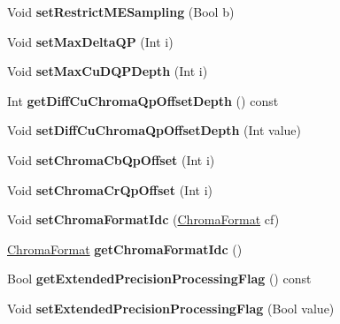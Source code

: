 \begin{DoxyCompactItemize}
Void {\bfseries set\+Restrict\+M\+E\+Sampling} (Bool b)
\item 
\mbox{\label{class_t_enc_cfg_a0a087715f52af0c0af8a11f75455883d}} 
Void {\bfseries set\+Max\+Delta\+QP} (Int i)
\item 
\mbox{\label{class_t_enc_cfg_a3681181db1f988b04ca9e5461ab0089b}} 
Void {\bfseries set\+Max\+Cu\+D\+Q\+P\+Depth} (Int i)
\item 
\mbox{\label{class_t_enc_cfg_ab35b9def53c78f90a6e587e3178370be}} 
Int {\bfseries get\+Diff\+Cu\+Chroma\+Qp\+Offset\+Depth} () const
\item 
\mbox{\label{class_t_enc_cfg_a1b9954226ceb29306fd27bab69add3d1}} 
Void {\bfseries set\+Diff\+Cu\+Chroma\+Qp\+Offset\+Depth} (Int value)
\item 
\mbox{\label{class_t_enc_cfg_accb0065bded81d1073dfc6c706ce52d1}} 
Void {\bfseries set\+Chroma\+Cb\+Qp\+Offset} (Int i)
\item 
\mbox{\label{class_t_enc_cfg_af2f90b56de85db7899ec6df6cda0093c}} 
Void {\bfseries set\+Chroma\+Cr\+Qp\+Offset} (Int i)
\item 
\mbox{\label{class_t_enc_cfg_afa0626c0efb70ed26858dd7607772581}} 
Void {\bfseries set\+Chroma\+Format\+Idc} (\hyperlink{_type_def_8h_a4a6c51c10f2eb04abc7209db7caff39f}{Chroma\+Format} cf)
\item 
\mbox{\label{class_t_enc_cfg_a88f091c5421e1bf7fb09679bc3254def}} 
\hyperlink{_type_def_8h_a4a6c51c10f2eb04abc7209db7caff39f}{Chroma\+Format} {\bfseries get\+Chroma\+Format\+Idc} ()
\item 
\mbox{\label{class_t_enc_cfg_aac447ae53691c5d656b9702e47cef253}} 
Bool {\bfseries get\+Extended\+Precision\+Processing\+Flag} () const
\item 
\mbox{\label{class_t_enc_cfg_a1558984aed8360ca07f756f14918fb10}} 
Void {\bfseries set\+Extended\+Precision\+Processing\+Flag} (Bool value)
\item 
\mbox{\label{class_t_enc_cfg_a8873f62fe95f8a52126284dff1028a3c}} 

\end{DoxyCompactItemize}
